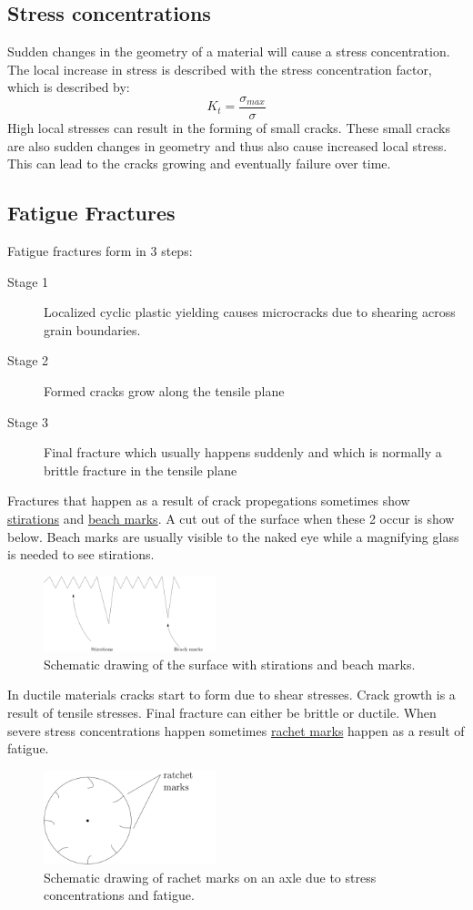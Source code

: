 \documentclass[11pt, a4paper]{article}
\begin{document}
\subsection{Stress concentrations}
Sudden changes in the geometry of a material will cause a stress concentration. The local increase in stress is described with the stress concentration factor, which is described by:
\begin{equation}
  K_t = \frac{\sigma_{max}}{\sigma}
\end{equation}
High local stresses can result in the forming of small cracks. These small cracks are also sudden changes in geometry and thus also cause increased local stress. This can lead to the cracks growing and eventually failure over time.


\subsection{Fatigue Fractures}
Fatigue fractures form in 3 steps:
\begin{description}
  \item[Stage 1] Localized cyclic plastic yielding causes microcracks due to shearing across grain boundaries.
  \item[Stage 2] Formed cracks grow along the tensile plane
  \item[Stage 3] Final fracture which usually happens suddenly and which is normally a brittle fracture in the tensile plane  
\end{description}
Fractures that happen as a result of crack propegations sometimes show \underline{stirations} and \underline{beach marks}. A cut out of the surface when these 2 occur is show below. Beach marks are usually visible to the naked eye while a magnifying glass is needed to see stirations.
\begin{figure}[h]
  \centerline{\includegraphics[width=50mm]{images/stirations.png}}
  \caption{Schematic drawing of the surface with stirations and beach marks.}
\end{figure}
In ductile materials cracks start to form due to shear stresses. Crack growth is a result of tensile stresses. Final fracture can either be brittle or ductile. When severe stress concentrations happen sometimes \underline{rachet marks} happen as a result of fatigue.
\begin{figure}[h]
  \centerline{\includegraphics[width=50mm]{images/ratchet_marks.png}}
  \caption{Schematic drawing of rachet marks on an axle due to stress concentrations and fatigue.}
\end{figure}
\end{document}
